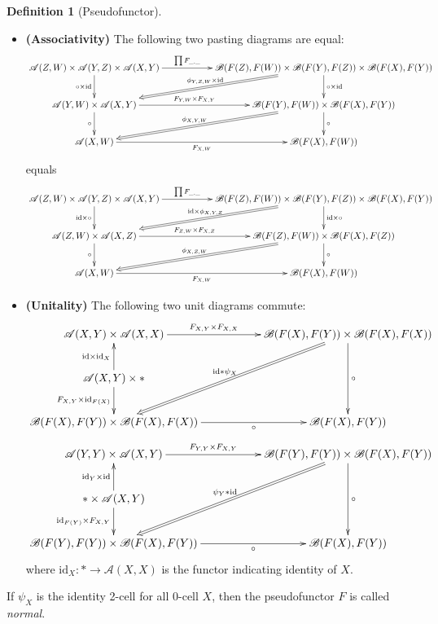 \documentclass[openany, amssymb, psamsfonts]{amsart}
\theoremstyle{definition}
\newtheorem{defn}{Definition}[section]
\numberwithin{equation}{section}
\newcommand{\A}{\mathscr{A}}
\newcommand{\B}{\mathscr{B}}
\newcommand{\id}{\mathrm{id}} %
\begin{document}
\begin{defn}[Pseudofunctor]
    \begin{itemize}
        \item[(i)] \textbf{(Associativity)} The following two pasting diagrams are equal:
        \begin{align*}
            \xymatrix{
                \A(Z,W)\times\A(Y,Z)\times\A(X,Y) \ar[d]_-{\circ\times\id} \ar[rr]^-{\prod F_{\_,\_}} && \B(F(Z),F(W))\times \B(F(Y),F(Z)) \times \B(F(X),F(Y)) \ar[d]^-{\circ\times \id} \ar@{=>}[dll]_-{\phi_{Y,Z,W}\times\id}\\
                \A(Y,W)\times\A(X,Y) \ar[d]_-{\circ} \ar[rr]^-{F_{Y,W}\times F_{X,Y}} && \B(F(Y),F(W))\times \B(F(X),F(Y)) \ar[d]^-{\circ} \ar@{=>}[dll]_-{\phi_{X,Y,W}}\\
                \A(X,W)\ar[rr]_-{F_{X,W}} && \B(F(X),F(W))
            }
        \end{align*}
        equals
        \begin{align*}
            \xymatrix{
                \A(Z,W)\times\A(Y,Z)\times\A(X,Y) \ar[d]_-{\id\times\circ} \ar[rr]^-{\prod F_{\_,\_}} && \B(F(Z),F(W))\times \B(F(Y),F(Z)) \times \B(F(X),F(Y)) \ar[d]^-{\id\times\circ} \ar@{=>}[dll]_-{\id\times\phi_{X,Y,Z}}\\
                \A(Z,W)\times\A(X,Z) \ar[d]_-{\circ} \ar[rr]^-{F_{Z,W}\times F_{X,Z}} && \B(F(Z),F(W))\times \B(F(X),F(Z)) \ar[d]^-{\circ} \ar@{=>}[dll]_-{\phi_{X,Z,W}}\\
                \A(X,W)\ar[rr]_-{F_{X,W}} && \B(F(X),F(W))
            }
        \end{align*}
        \item[(ii)] \textbf{(Unitality)} The following two unit diagrams commute:
        \begin{align*}
            \xymatrix{
                \A(X,Y)\times\A(X,X)\ar[rr]^-{F_{X,Y}\times F_{X,X}} && \B(F(X),F(Y))\times \B(F(X),F(X)) \ar[dd]^-{\circ} \ar@{=>}[ddll]_-{\id \mathrm{*}\psi_X}\\
                \A(X,Y)\times \mathrm{*} \ar[u]^-{\id\times \id_X} \ar[d]_-{F_{X,Y}\times \id_{F(X)}}\\
                \B(F(X),F(Y))\times \B(F(X),F(X)) \ar[rr]_-{\circ} && \B(F(X),F(Y))
            }
        \end{align*}
        \begin{align*}
            \xymatrix{
                \A(Y,Y)\times\A(X,Y)\ar[rr]^-{F_{Y,Y}\times F_{X,Y}} && \B(F(Y),F(Y))\times \B(F(X),F(Y)) \ar[dd]^-{\circ} \ar@{=>}[ddll]_-{\psi_Y\mathrm{*}\id}\\
                \mathrm{*}\times\A(X,Y) \ar[u]^-{\id_Y\times \id} \ar[d]_-{\id_{F(Y)}\times F_{X,Y}}\\
                \B(F(Y),F(Y))\times \B(F(X),F(Y)) \ar[rr]_-{\circ} && \B(F(X),F(Y))
            }
        \end{align*}
        where $\id_X:*\rightarrow\A(X,X)$ is the functor indicating identity of $X$.
    \end{itemize}

    If $\psi_X$ is the identity 2-cell for all 0-cell $X$, then the pseudofunctor $F$ is called \emph{normal}.
\end{defn}
\end{document}
